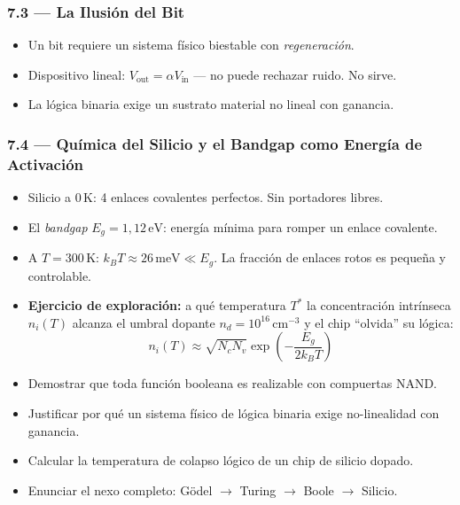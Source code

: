 \documentclass[11pt, letterpaper]{article}
\begin{document}
\subsubsection{7.3 --- La Ilusi\'on del Bit}
\begin{itemize}
  \item Un bit requiere un sistema f\'isico biestable con \emph{regeneraci\'on}.
  \item Dispositivo lineal: $V_\text{out}=\alpha V_\text{in}$ --- no puede rechazar ruido. No sirve.
  \item La l\'ogica binaria exige un sustrato material no lineal con ganancia.
\end{itemize}

\subsubsection{7.4 --- Qu\'imica del Silicio y el Bandgap como Energ\'ia de Activaci\'on}
\begin{itemize}
  \item Silicio a $0\,\text{K}$: 4 enlaces covalentes perfectos. Sin portadores libres.
  \item El \emph{bandgap} $E_g=1{,}12\,\text{eV}$: energ\'ia m\'inima para romper un enlace covalente.
  \item A $T=300\,\text{K}$: $k_BT\approx 26\,\text{meV}\ll E_g$. La fracci\'on de enlaces rotos es peque\~na y controlable.
  \item \textbf{Ejercicio de exploraci\'on:} a qu\'e temperatura $T^*$ la concentraci\'on intr\'inseca $n_i(T)$ alcanza el umbral dopante $n_d=10^{16}\,\text{cm}^{-3}$ y el chip ``olvida'' su l\'ogica:
  \[n_i(T)\approx\sqrt{N_cN_v}\exp\!\left(-\frac{E_g}{2k_BT}\right)\]
\end{itemize}

\begin{objetivos}
\begin{itemize}
  \item Demostrar que toda funci\'on booleana es realizable con compuertas NAND.
  \item Justificar por qu\'e un sistema f\'isico de l\'ogica binaria exige no-linealidad con ganancia.
  \item Calcular la temperatura de colapso l\'ogico de un chip de silicio dopado.
  \item Enunciar el nexo completo: G\"odel $\to$ Turing $\to$ Boole $\to$ Silicio.
\end{itemize}
\end{objetivos}
\end{document}
